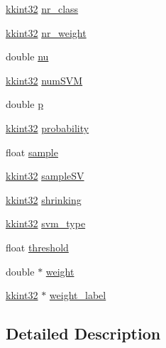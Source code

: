 \begin{DoxyCompactItemize}
\item 
\hyperlink{namespace_k_k_b_a8fa4952cc84fda1de4bec1fbdd8d5b1b}{kkint32} \hyperlink{struct_s_v_m233_1_1svm__parameter_a6fa48dd0b10a8f9cbbc8c0d571404345}{nr\+\_\+class}
\item 
\hyperlink{namespace_k_k_b_a8fa4952cc84fda1de4bec1fbdd8d5b1b}{kkint32} \hyperlink{struct_s_v_m233_1_1svm__parameter_a57a427d9f5046cc6ebd4f67a34c7204a}{nr\+\_\+weight}
\item 
double \hyperlink{struct_s_v_m233_1_1svm__parameter_af40906fef0d3c731d1eb69b80d568f30}{nu}
\item 
\hyperlink{namespace_k_k_b_a8fa4952cc84fda1de4bec1fbdd8d5b1b}{kkint32} \hyperlink{struct_s_v_m233_1_1svm__parameter_aac6ce26b15ecd7ce74d86a06982fae07}{num\+S\+VM}
\item 
double \hyperlink{struct_s_v_m233_1_1svm__parameter_abb3a034727f945d57e243c98f2ce3bd4}{p}
\item 
\hyperlink{namespace_k_k_b_a8fa4952cc84fda1de4bec1fbdd8d5b1b}{kkint32} \hyperlink{struct_s_v_m233_1_1svm__parameter_a361cd1b3984d025010e839afc3335197}{probability}
\item 
float \hyperlink{struct_s_v_m233_1_1svm__parameter_a63dd6c465973afa907155971db828985}{sample}
\item 
\hyperlink{namespace_k_k_b_a8fa4952cc84fda1de4bec1fbdd8d5b1b}{kkint32} \hyperlink{struct_s_v_m233_1_1svm__parameter_a962ae17b97aa2011984e49b4f96aba8b}{sample\+SV}
\item 
\hyperlink{namespace_k_k_b_a8fa4952cc84fda1de4bec1fbdd8d5b1b}{kkint32} \hyperlink{struct_s_v_m233_1_1svm__parameter_a383beec375da659e6a75ebebd95dfa9a}{shrinking}
\item 
\hyperlink{namespace_k_k_b_a8fa4952cc84fda1de4bec1fbdd8d5b1b}{kkint32} \hyperlink{struct_s_v_m233_1_1svm__parameter_aa4cc55eaf546e2edb0ff62c5a5f8466e}{svm\+\_\+type}
\item 
float \hyperlink{struct_s_v_m233_1_1svm__parameter_a7a43eeb6067c4ae3bf32aa151f43195a}{threshold}
\item 
double $\ast$ \hyperlink{struct_s_v_m233_1_1svm__parameter_a99a789efdc98bdea42b30064105f87b3}{weight}
\item 
\hyperlink{namespace_k_k_b_a8fa4952cc84fda1de4bec1fbdd8d5b1b}{kkint32} $\ast$ \hyperlink{struct_s_v_m233_1_1svm__parameter_a7a82221dd44668d44efdf0a47f76b751}{weight\+\_\+label}
\end{DoxyCompactItemize}


\subsection{Detailed Description}


